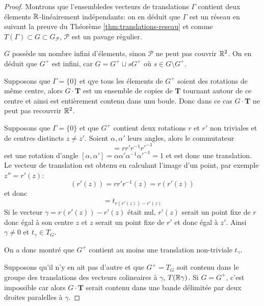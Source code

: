 \begin{proof}
	Montrons que l'ensembledes vecteurs de translations $\Gamma$ contient deux
	élements $\mathbb{R}$-linéairement indépendants: on en déduit que $\Gamma$ est un
	réseau en suivant la preuve du Théorème \ref{thm:translations-reseau} et
	comme $T(\Gamma) \subset G \subset G_\mathcal{P}$, $\mathcal{P}$ est un
	pavage régulier.

	$G$ possède un nombre infini d'élements, sinon $\mathcal{P}$ ne peut pas
	couvrir $\mathbb{R}^2$. On en déduit que $G^+$ est infini, car
	$G = G^+ \sqcup sG^+$ où $s \in G \setminus G^+$.

	Supposons que $\Gamma = \{0\}$ et qye tous les élements de $G^+$ soient des
	rotations de même centre, alors $G \cdot \mathbf{T}$ est un ensemble de copies de
	$\mathbf{T}$ tournant autour de ce centre et ainsi est entièrement contenu
	dans unu boule. Donc dans ce cas $G \cdot \mathbf{T}$
	ne peut pas recouvrir $\mathbb{R}^2$.

	Supposons que $\Gamma = \{0\}$ et que $G^+$ contient deux rotations $r$ et
	$r'$ non triviales et de centres distincts $z \neq z'$.
	Soient $\alpha, \alpha'$ leurs angles, alors le commutateur
	\begin{equation*}
		[r, r'] = rr'r^{-1}r'^{-1}
	\end{equation*}
	est une rotation d'angle
	$[\alpha, \alpha'] = \alpha \alpha' \alpha^{-1} \alpha'^{-1} = 1$ et est donc
	une translation. Le vecteur de translation est obtenu en calculant l'image
	d'un point, par exemple $z'' = r'(z)$:
	\begin{equation*}
		[r,r'](r'(z)) = rr'r^{-1}(z) = r(r'(z))
	\end{equation*}
	et donc
	\begin{equation*}
		[r, r'] = t_{r(r'(z)) - r'(z)}
	\end{equation*}
	Si le vecteur $\gamma = r(r'(z)) - r'(z)$ était nul, $r'(z)$ serait un point
	fixe de $r$ donc égal à son centre $z$ et $z$ serait un point fixe de $r'$
	et donc égal à $z'$. Ainsi $\gamma \neq 0$ et $t_\gamma \in T_G$.

	On a donc montré que $G^+$ contient au moins une translation non-triviale
	$t_\gamma$.

	Supposons qu'il n'y en ait pas d'autre et que $G^+ = T_G$ soit contenu dans
	le groupe des translations des vecteurs colineaires à $\gamma$,
	$T(\mathbb{R}\gamma)$. Si $G = G^+$, c'est impossible car alors $G \cdot \mathbf{T}$
	serait contenu dans une bande délimitée par deux droites paralelles à
	$\gamma$.


\end{proof}
